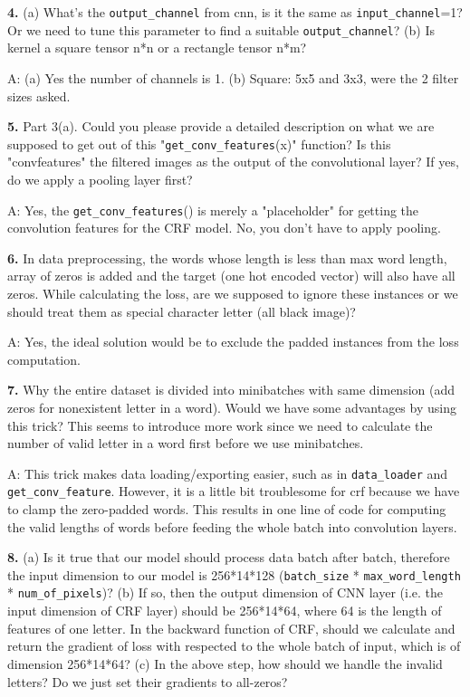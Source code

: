 \documentclass[11pt]{report}
\begin{document}
\textbf{4.} (a) What's the \verb#output_channel# from cnn, is it the same as \verb#input_channel#=1? Or we need to tune this parameter to find a suitable \verb#output_channel#?
(b) Is kernel a square tensor n*n or a rectangle tensor n*m?

A: (a) Yes the number of channels is 1. (b) Square: 5x5 and 3x3, were the 2 filter sizes asked. 

\textbf{5.} Part 3(a). Could you please provide a detailed description on what we are supposed to get out of this "\verb#get_conv_features#(x)" function? 
Is this "convfeatures"  the filtered images as the output of the convolutional layer? If yes, do we apply a pooling layer first?

A: Yes, the \verb#get_conv_features#() is merely a "placeholder" for getting the convolution features for the CRF model. No, you don't have to apply pooling. 

\textbf{6.} In data preprocessing, the words whose length is less than max word length, array of zeros is added and the target (one hot encoded vector) will also have all zeros. While calculating the loss, are we supposed to ignore these instances or we should treat them as special character letter (all black image)?

A: Yes, the ideal solution would be to exclude the padded instances from the loss computation. 


\textbf{7.} 
Why the entire dataset is divided into minibatches with same dimension (add zeros for nonexistent letter in a word). Would we have some advantages by using this trick? This seems to introduce more work since we need to calculate the number of valid letter in a word first before we use minibatches.

A: This trick makes data loading/exporting easier, such as in \verb#data_loader# and \verb#get_conv_feature#. However, it is a little bit troublesome for crf because we have to clamp the zero-padded words. This results in one line of code for computing the valid lengths of words before feeding the whole batch into convolution layers.


\textbf{8.} 
(a) Is it true that our model should process data batch after batch, therefore the input dimension to our model is 256*14*128 (\verb#batch_size# * \verb#max_word_length# * \verb#num_of_pixels#)?  
(b) If so, then the output dimension of CNN layer (i.e. the input dimension of CRF layer) should be 256*14*64, where 64 is the length of features of one letter. In the backward function of CRF, should we calculate and return the gradient of loss with respected to the whole batch of input, which is of dimension 256*14*64?
(c) In the above step, how should we handle the invalid letters? Do we just set their gradients to all-zeros?
\end{document}

